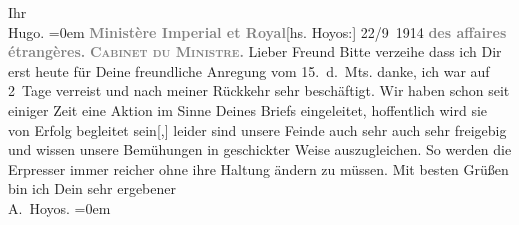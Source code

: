 \begin{ledgroupsized}[t]{13cm}
           Ihr{\\[\baselineskip]}\spacefill\mbox{Hugo.}\pend
           \leftskip=0em{}{\bigskip}\pstart
           \noindent{}{\pb}\textcolor{gray}{\textbf{Ministère Imperial et Royal}}\hfill {[}hs. Hoyos:{]} 22/9 1914\pend
           \pstart
           \textcolor{gray}{\textbf{des affaires étrangères.}}\pend
           \pstart
           \textcolor{gray}{\textbf{\textsc{Cabinet du Ministre.}}}\pend
           \pstart{}Lieber Freund\pend\pstart
           Bitte verzeihe dass ich Dir erst heute für Deine freundliche Anregung vom
                  15. d. Mts. danke, ich war auf 2 Tage verreist und nach meiner
               Rückkehr sehr beschäftigt. Wir haben schon seit einiger Zeit eine Aktion im Sinne
               Deines Briefs {\pb}eingeleitet,
               hoffentlich wird sie von Erfolg begleitet sein{[},{]} leider sind
               unsere Feinde auch sehr auch sehr freigebig und wissen unsere Bemühungen in
               geschickter Weise auszugleichen. So werden die Erpresser immer reicher ohne ihre
               Haltung ändern zu müssen.\pend
           \pstart
           Mit besten Grüßen bin ich {\pb}Dein sehr ergebener {\\[\baselineskip]}\spacefill\mbox{A. Hoyos.}\pend
           \leftskip=0em{}\endnumbering{}\end{ledgroupsized}  \newcommand{\dateiname}{L02197}\newcommand{\titel}{Hugo von Hofmannsthal an Arthur Schnitzler, 24. 9. [1914]}\newcommand{\editorInnen}{Martin Anton Müller und Gerd-Hermann Susen}
      